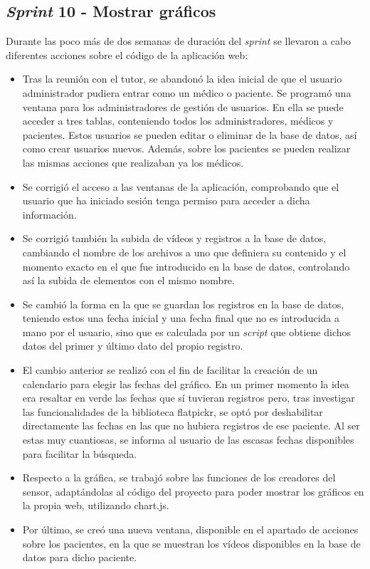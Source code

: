 \subsection{\textit{Sprint} 10 - Mostrar gráficos}
Durante las poco más de dos semanas de duración del \textit{sprint} se llevaron a cabo diferentes acciones sobre el código de la aplicación web:
\begin{itemize}
    \item Tras la reunión con el tutor, se abandonó la idea inicial de que el usuario administrador pudiera entrar como un médico o paciente. Se programó una ventana para los administradores de gestión de usuarios. En ella se puede acceder a tres tablas, conteniendo todos los administradores, médicos y pacientes. Estos usuarios se pueden editar o eliminar de la base de datos, así como crear usuarios nuevos. Además, sobre los pacientes se pueden realizar las mismas acciones que realizaban ya los médicos.
    \item Se corrigió el acceso a las ventanas de la aplicación, comprobando que el usuario que ha iniciado sesión tenga permiso para acceder a dicha información.
    \item Se corrigió también la subida de vídeos y registros a la base de datos, cambiando el nombre de los archivos a uno que definiera su contenido y el momento exacto en el que fue introducido en la base de datos, controlando así la subida de elementos con el mismo nombre.
    \item Se cambió la forma en la que se guardan los registros en la base de datos, teniendo estos una fecha inicial y una fecha final que no es introducida a mano por el usuario, sino que es calculada por un \textit{script} que obtiene dichos datos del primer y último dato del propio registro.
    \item El cambio anterior se realizó con el fin de facilitar la creación de un calendario para elegir las fechas del gráfico. En un primer momento la idea era resaltar en verde las fechas que sí tuvieran registros pero, tras investigar las funcionalidades de la biblioteca flatpickr, se optó por deshabilitar directamente las fechas en las que no hubiera registros de ese paciente. Al ser estas muy cuantiosas, se informa al usuario de las escasas fechas disponibles para facilitar la búsqueda.
    \item Respecto a la gráfica, se trabajó sobre las funciones de los creadores del sensor, adaptándolas al código del proyecto para poder mostrar los gráficos en la propia web, utilizando chart.js.
    \item Por último, se creó una nueva ventana, disponible en el apartado de acciones sobre los pacientes, en la que se muestran los vídeos disponibles en la base de datos para dicho paciente.
\end{itemize}

